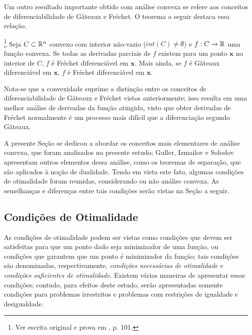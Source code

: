 Um outro resultado importante obtido com an\'{a}lise convexa se refere aos conceitos de diferenciabilidade de G\^{a}teaux e Fr\'{e}chet. O teorema a seguir destaca essa rela\c{c}\~{a}o.

\begin{theorem}\footnote{Ver escrita original e prova em \cite{guller}, p. 101.}
Seja $C \subset \mathbb{R}^{n}$ convexo com interior n\~{a}o-vazio ($int(C) \ne \emptyset$) e $f: C \to \mathbb{R}$ uma fun\c{c}\~{a}o convexa. Se todas as derivadas parciais de $f$ existem para um ponto $\mathbf{x}$ no interior de $C$, $f$ \'{e} Fr\'{e}chet diferenci\'{a}vel em $\mathbf{x}$. Mais ainda, se $f$ \'{e} G\^{a}teaux diferenci\'{a}vel em $\mathbf{x}$, $f$ \'{e} Fr\'{e}chet diferenci\'{a}vel em $\mathbf{x}$.
\end{theorem}

Nota-se que a convexidade suprime a distin\c{c}\~{a}o entre os conceitos de diferenciabilidade de G\^{a}teaux e Fr\'{e}chet vistos anteriormente; isso resulta em uma melhor an\'{a}lise de derivadas da fun\c{c}\~{a}o atingida, visto que obter derivadas de Fr\'{e}chet normalmente \'{e} um processo mais dif\'{i}cil que a diferencia\c{c}\~{a}o segundo G\^{a}teaux.

A presente Se\c{c}\~{a}o se dedicou a abordar os conceitos mais elementares de an\'{a}lise convexa, que foram analisados no presente estudo; Guller, Izmailov e Solodov apresentam outros elementos dessa an\'{a}lise, como os teoremas de separa\c{c}\~{a}o, que s\~{a}o aplicados \`{a} no\c{c}\~{a}o de dualidade. Tendo em vista este fato, algumas condi\c{c}\~{o}es de otimalidade foram reunidas, considerando ou n\~{a}o an\'{a}lise convexa. As semelhan\c{c}as e diferen\c{c}as entre tais condi\c{c}\~{o}es ser\~{a}o vistas na Se\c{c}\~{a}o a seguir.


\subsection{Condi\c{c}\~{o}es de Otimalidade}

As condi\c{c}\~{o}es de otimalidade podem ser vistas como condi\c{c}\~{o}es que devem ser satisfeitas para que um ponto dado seja minimizador de uma fun\c{c}\~{a}o, ou condi\c{c}\~{o}es que garantem que um ponto \'{e} minimizador da fun\c{c}\~{a}o; tais condi\c{c}\~{o}es s\~{a}o denominadas, respectivamente, \textit{condi\c{c}\~{o}es necess\'{a}rias de otimalidade} e \textit{condi\c{c}\~{o}es suficientes de otimalidade}. Existem v\'{a}rias maneiras de apresentar essas condi\c{c}\~{o}es; contudo, para efeitos deste estudo, ser\~{a}o apresentadas somente condi\c{c}\~{o}es para problemas irrestritos e problemas com restri\c{c}\~{o}es de igualdade e desigualdade.

